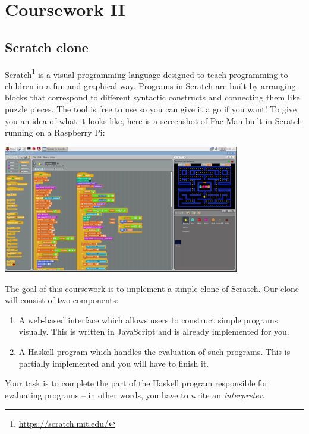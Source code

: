 
\newcommand{\deadlineTwoTime}{noon}
\newcommand{\deadlineTwoDate}{23 March 2021}
\newcommand{\submissionTwoURL}{https://tabula.warwick.ac.uk/coursework/submission/ac09b7de-5e75-45f9-87e9-ab847d96a001}
\newcommand{\classroomTwoURL}{https://classroom.github.com/a/aW9z1Yip}


\cleardoublepage
\chapter{Coursework II}

\section{Scratch clone}

Scratch\footnote{\url{https://scratch.mit.edu/}} is a visual programming language designed to teach programming to children in a fun and graphical way. Programs in Scratch are built by arranging blocks that correspond to different syntactic constructs and connecting them like puzzle pieces. The tool is free to use so you can give it a go if you want! To give you an idea of what it looks like, here is a screenshot of Pac-Man built in Scratch running on a Raspberry Pi:

\begin{center}
\includegraphics[width=390px]{cswk/scratch_rpi.png}
\end{center}

The goal of this coursework is to implement a simple clone of Scratch. Our clone will consist of two components:
\begin{enumerate}
    \item A web-based interface which allows users to construct simple programs visually. This is written in JavaScript and is already implemented for you.
    \item A Haskell program which handles the evaluation of such programs. This is partially implemented and you will have to finish it.
\end{enumerate}
Your task is to complete the part of the Haskell program responsible for evaluating programs -- in other words, you have to write an \emph{interpreter}.

